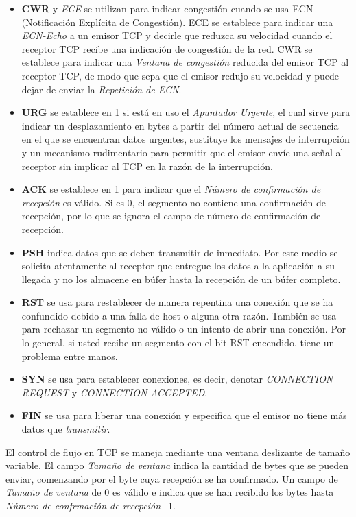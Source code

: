 \documentclass[10pt,a4paper]{report}
\begin{document}
	\begin{itemize}
		\item \textbf{CWR} y \textit{ECE} se utilizan para indicar congestión cuando se 
		usa ECN (Notificación Explícita de Congestión). ECE se establece para indicar una 
		\textit{ECN-Echo} a un emisor TCP y decirle que reduzca su velocidad cuando el 
		receptor TCP recibe una indicación de congestión de la red. CWR se establece 
		para indicar una \textit{Ventana de congestión} reducida del emisor TCP al 
		receptor TCP, de modo que sepa que el emisor redujo su velocidad y puede dejar 
		de enviar la \textit{Repetición de ECN}.
		\item \textbf{URG} se establece en 1 si está en uso el \textit{Apuntador Urgente}, el cual 
		sirve para indicar un desplazamiento en bytes a partir del número actual de 
		secuencia en el que se encuentran datos urgentes, sustituye los mensajes de 
		interrupción y un mecanismo rudimentario para permitir que el emisor envíe una 
		señal al receptor sin implicar al TCP en la razón de la interrupción.
		\item \textbf{ACK} se establece en 1 para indicar que el \textit{Número de confirmación 
		de recepción} es válido. Si es 0, el segmento no contiene una confirmación de 
		recepción, por lo que se ignora el campo de número de confirmación de 
		recepción.
		\item \textbf{PSH} indica datos que se deben transmitir de inmediato. Por este medio se 
		solicita atentamente al receptor que entregue los datos a la aplicación a su 
		llegada y no los almacene en búfer hasta la recepción de un búfer completo.
		\item \textbf{RST} se usa para restablecer de manera repentina una conexión 
		que se ha confundido debido a una falla de host o alguna otra razón. También se 
		usa para rechazar un segmento no válido o un intento de abrir una conexión. Por 
		lo general, si usted recibe un segmento con el bit RST encendido, tiene un 
		problema entre manos.
		\item \textbf{SYN} se usa para establecer conexiones, es decir, denotar 
		\textit{CONNECTION REQUEST} y \textit{CONNECTION ACCEPTED}.
		\item \textbf{FIN} se usa para liberar una conexión y especifica que el emisor no 
		tiene más datos que \textit{transmitir}. 
	\end{itemize}
\par El control de flujo en TCP se maneja mediante una ventana deslizante de tamaño 
variable. El campo \textit{Tamaño de ventana} indica la cantidad de bytes que se 
pueden enviar, comenzando por el byte cuya recepción se ha confirmado. Un campo 
de \textit{Tamaño de ventana} de 0 es válido e indica que se han recibido los bytes 
hasta \textit{Número de confrmación de recepción}$-$1.
\end{document}
